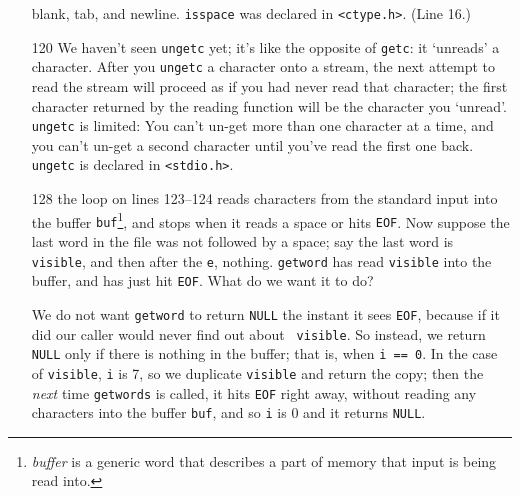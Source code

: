 \begin{itemize}
blank, tab, and newline.  {\tt isspace} was declared in {\tt <ctype.h>}.
(Line 16.)
\item[120] We haven't seen {\tt ungetc} yet; it's like the opposite of
{\tt getc}: it `unreads' a character. After you {\tt ungetc} a character
onto a stream, the next attempt to read the stream will proceed as if
you had never read that character; the first character returned by the
reading function will be the character you `unread'. {\tt ungetc} is
limited: You can't un-get more than one character at a time, and you
can't un-get a second character until you've read the first one back.
{\tt ungetc} is declared in {\tt <stdio.h>}.
\item[128] the loop on lines 123--124 reads characters from the standard
input into the buffer {\tt buf}\footnote{{\em buffer}\/ is a generic
word that describes a part of memory that input is being read into.},
and stops when it reads a space or hits {\tt EOF}.  Now suppose the last
word in the file was not followed by a space; say the last word is {\tt
visible}, and then after the {\tt e}, nothing.  {\tt getword} has 
read {\tt visible} into the buffer, and has just hit {\tt EOF}.  What do
we want it to do?  

We do not want {\tt getword} to return {\tt NULL} the instant it sees
{\tt EOF}, because if it did our caller would never find out about {\tt
visible}.  So instead, we return {\tt NULL} only if there is nothing in
the buffer; that is, when {\tt i == 0}.  In the case of {\tt visible},
{\tt i} is 7, so we duplicate {\tt visible} and return the copy; then
the {\em next}\/ time {\tt getwords} is called, it hits {\tt EOF} right
away, without reading any characters into the buffer {\tt buf}, and so
{\tt i} is 0 and it returns {\tt NULL}.  
\end{itemize} 
